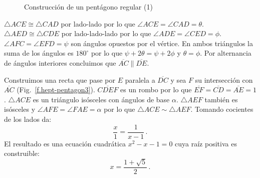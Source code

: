 \begin{figure}[t]
\begin{center}
\end{center}
\caption{Construcción de un pentágono regular (1)}\label{f.hept-pentagon2}
\end{figure}
$\triangle ACE\cong \triangle CAD$ por lado-lado por lo que $\angle ACE=\angle CAD=\theta$. $\triangle AED\cong\triangle CDE$ por lado-lado-lado por lo que $\angle ADE=\angle CED=\phi$. $\angle AFC=\angle EFD=\psi$ son ángulos opuestos por el vértice. En ambos triángulos la suma de los ángulos es $180^\circ$ por lo que
$\psi+2\theta=\psi+ 2\phi$ y $\theta=\phi$.
Por alternancia de ángulos interiores concluimos que $\overline{AC}\parallel \overline{DE}$.

Construimos una recta que pase por $E$ paralela a $\overline{DC}$ y sea $F$ su intersección con $\overline{AC}$ (Fig.~\ref{f.hept-pentagon3}). $\overline{CDEF}$ es un rombo por lo que $\overline{EF}=\overline{CD}=\overline{AE}=1$. $\triangle ACE$ es un triángulo isósceles con ángulos de base $\alpha$. $\triangle AEF$ también es isósceles y $\angle AFE=\angle FAE=\alpha$ por lo que $\triangle ACE\sim\triangle AEF$. Tomando cocientes de los lados da:
\[
\frac{x}{1}=\frac{1}{x-1}\,.
\]
El resultado es una ecuación cuadrática $x^2-x-1=0$
cuya raíz positiva es construible:
\[
x=\frac{1+\sqrt{5}}{2}\,.
\]

